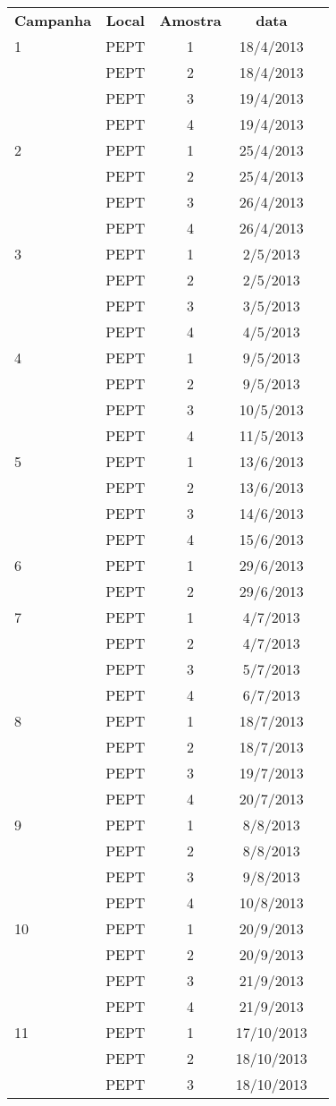 \begin{tabular}{lcccc}  
\textbf{Campanha} & \textbf{Local} & \textbf{Amostra} & \textbf{data} \\
1&PEPT&1&18/4/2013\\
 &PEPT&2&18/4/2013\\
 &PEPT&3&19/4/2013\\
 &PEPT&4&19/4/2013\\
2&PEPT&1&25/4/2013\\
&PEPT&2&25/4/2013\\
&PEPT&3&26/4/2013\\
&PEPT&4&26/4/2013\\
3&PEPT&1&2/5/2013\\
&PEPT&2&2/5/2013\\
&PEPT&3&3/5/2013\\
&PEPT&4&4/5/2013\\
4&PEPT&1&9/5/2013\\
&PEPT&2&9/5/2013\\
&PEPT&3&10/5/2013\\
&PEPT&4&11/5/2013\\
5&PEPT&1&13/6/2013\\
&PEPT&2&13/6/2013\\
&PEPT&3&14/6/2013\\
&PEPT&4&15/6/2013\\
6&PEPT&1&29/6/2013\\
&PEPT&2&29/6/2013\\
7&PEPT&1&4/7/2013\\
&PEPT&2&4/7/2013\\
&PEPT&3&5/7/2013\\
&PEPT&4&6/7/2013\\
8&PEPT&1&18/7/2013\\
&PEPT&2&18/7/2013\\
&PEPT&3&19/7/2013\\
&PEPT&4&20/7/2013\\
9&PEPT&1&8/8/2013\\
&PEPT&2&8/8/2013\\
&PEPT&3&9/8/2013\\
&PEPT&4&10/8/2013\\
10&PEPT&1&20/9/2013\\
&PEPT&2&20/9/2013\\
&PEPT&3&21/9/2013\\
&PEPT&4&21/9/2013\\
11&PEPT&1&17/10/2013\\
&PEPT&2&18/10/2013\\
&PEPT&3&18/10/2013\\

\end{tabular}
